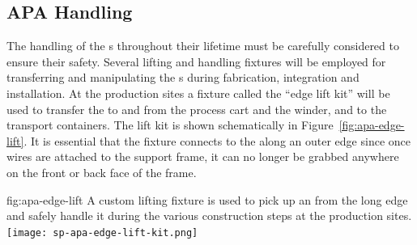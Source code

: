 

\subsection{APA Handling}
\label{sec:fdsp-apa-transport-handling}

The handling of the s throughout their lifetime must be carefully considered to ensure their safety.  Several lifting and handling fixtures will be employed for transferring and manipulating the s during fabrication, integration and installation.  At the production sites a fixture called the ``edge lift kit'' will be used to transfer the  to and from the process cart and the winder, and to the transport containers.  The lift kit is shown schematically in Figure~\ref{fig:apa-edge-lift}.  It is essential that the fixture connects to the  along an outer edge since once wires are attached to the support frame, it can no longer be grabbed anywhere on the front or back face of the frame. 

\begin{dunefigure}{fig:apa-edge-lift}
{A custom lifting fixture is used to pick up an  from the long edge and safely handle it during the various construction steps at the production sites.}  
\texttt{[image: sp-apa-edge-lift-kit.png]} 
\end{dunefigure}




